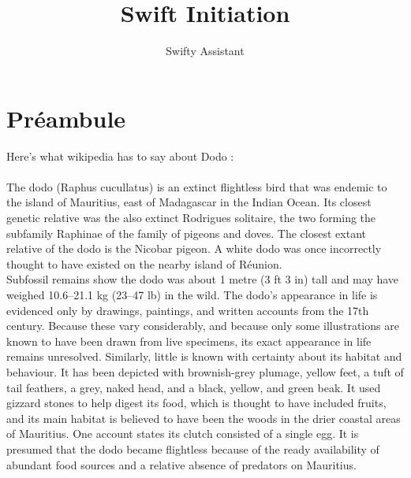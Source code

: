 \documentclass{42}
\begin{document}
                           \title{Swift Initiation}
                          \subtitle{Swifty Assistant}


\maketitle

\tableofcontents


\newpage

    \chapter{Préambule}

    \small
    Here's what wikipedia has to say about Dodo :\\
    \\
    The dodo (Raphus cucullatus) is an extinct flightless bird that was endemic to the island of Mauritius, east of Madagascar in the Indian Ocean. Its closest genetic relative was the also extinct Rodrigues solitaire, the two forming the subfamily Raphinae of the family of pigeons and doves. The closest extant relative of the dodo is the Nicobar pigeon. A white dodo was once incorrectly thought to have existed on the nearby island of Réunion.\\

    Subfossil remains show the dodo was about 1 metre (3 ft 3 in) tall and may have weighed 10.6–21.1 kg (23–47 lb) in the wild. The dodo's appearance in life is evidenced only by drawings, paintings, and written accounts from the 17th century. Because these vary considerably, and because only some illustrations are known to have been drawn from live specimens, its exact appearance in life remains unresolved. Similarly, little is known with certainty about its habitat and behaviour. It has been depicted with brownish-grey plumage, yellow feet, a tuft of tail feathers, a grey, naked head, and a black, yellow, and green beak. It used gizzard stones to help digest its food, which is thought to have included fruits, and its main habitat is believed to have been the woods in the drier coastal areas of Mauritius. One account states its clutch consisted of a single egg. It is presumed that the dodo became flightless because of the ready availability of abundant food sources and a relative absence of predators on Mauritius.\\
\end{document}
